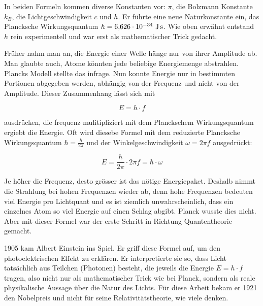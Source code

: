 

	In beiden Formeln kommen diverse Konstanten vor: $\pi$, die Bolzmann Konstante $k_B$, die Lichtgeschwindigkeit $c$ und $h$. 
	Er führte eine neue Naturkonstante ein, das Plancksche Wirkungsquantum $h = 6{,}626 \cdot 10^{-34} \ \text{J\,s}$. 
	Wie oben erwähnt entstand $h$ rein experimentell und war erst als mathematischer Trick gedacht. 
	
	
	Früher nahm man an, die Energie einer Welle hänge nur von ihrer Amplitude ab. 
	Man glaubte auch, Atome könnten jede beliebige Energiemenge abstrahlen. 
	Plancks Modell stellte das infrage. 
	Nun konnte Energie nur in bestimmten Portionen abgegeben werden, abhängig von der Frequenz und nicht von der Amplitude. 
	Dieser Zusammenhang lässt sich mit  
	
	\begin{equation}
		E = h \cdot f
	\end{equation}
	
	 ausdrücken, die frequenz mulitipliziert mit dem Planckschem Wirkungsquantum ergiebt die Energie.
	 Oft wird diesebe Formel mit dem reduzierte Plancksche Wirkungsquantum $\hbar = \frac{h}{2\pi}$ und der Winkelgeschwindigkeit $\omega = 2 \pi f$ ausgedrückt:
	 
	 \begin{equation}
	  	E = \frac{h}{2\pi} \cdot 2\pi f = \hbar \cdot \omega
	 \end{equation}
	 
	 
	Je höher die Frequenz, desto grösser ist das nötige Energiepaket. 
	Deshalb nimmt die Strahlung bei hohen Frequenzen wieder ab, denn hohe Frequenzen bedeuten viel Energie pro Lichtquant und es ist ziemlich unwahrscheinlich, dass ein einzelnes Atom so viel Energie auf einen Schlag abgibt. 
	Planck wusste dies nicht. 
	Aber mit dieser Formel war der erste Schritt in Richtung  Quantentheorie gemacht.

	
	
	
	1905 kam Albert Einstein ins Spiel. 
	Er griff diese Formel auf, um den photoelektrischen Effekt zu erklären. 
	Er interpretierte sie so, dass Licht tatsächlich aus Teilchen (Photonen) besteht, die jeweils die Energie $E = h \cdot f$ tragen, also nicht nur als mathematischer Trick wie bei Planck, sondern als reale physikalische Aussage über die Natur des Lichts.
	Für diese Arbeit bekam er 1921 den Nobelpreis und nicht für seine Relativitätstheorie, wie viele denken.
	
